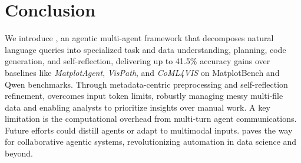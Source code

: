 \section{Conclusion}

We introduce \methodname{}, an agentic multi-agent framework that decomposes natural language queries into specialized task and data understanding, planning, code generation, and self-reflection, delivering up to 41.5\% accuracy gains over baselines like \textit{MatplotAgent}, \textit{VisPath}, and \textit{CoML4VIS} on MatplotBench and Qwen benchmarks. 
Through metadata-centric preprocessing and self-reflection refinement, \methodname{} overcomes input token limits, robustly managing messy multi-file data and enabling analysts to prioritize insights over manual work.
A key limitation is the computational overhead from multi-turn agent communications. Future efforts could distill agents or adapt to multimodal inputs. \methodname{} paves the way for collaborative agentic systems, revolutionizing automation in data science and beyond.